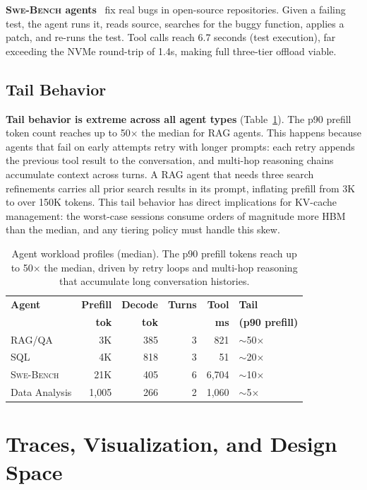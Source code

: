 \documentclass[10pt,twocolumn]{article}
\begin{document}
\textbf{\textsc{Swe-Bench} agents}~\cite{yang2024swebench} fix real bugs in open-source repositories. Given a failing test, the agent runs it, reads source, searches for the buggy function, applies a patch, and re-runs the test. Tool calls reach 6.7 seconds (test execution), far exceeding the NVMe round-trip of 1.4s, making full three-tier offload viable.

\subsection{Tail Behavior}

\textbf{Tail behavior is extreme across all agent types} (Table~\ref{tab:agents}). The p90 prefill token count reaches up to 50$\times$ the median for RAG agents. This happens because agents that fail on early attempts retry with longer prompts: each retry appends the previous tool result to the conversation, and multi-hop reasoning chains accumulate context across turns. A RAG agent that needs three search refinements carries all prior search results in its prompt, inflating prefill from 3K to over 150K tokens. This tail behavior has direct implications for KV-cache management: the worst-case sessions consume orders of magnitude more HBM than the median, and any tiering policy must handle this skew.

\begin{table}[t]
\caption{Agent workload profiles (median). The p90 prefill tokens reach up to 50$\times$ the median, driven by retry loops and multi-hop reasoning that accumulate long conversation histories.}
\label{tab:agents}
\centering
\footnotesize
\begin{tabular}{lrrrrl}
\toprule
\textbf{Agent} & \textbf{Prefill} & \textbf{Decode} & \textbf{Turns} & \textbf{Tool} & \textbf{Tail} \\
 & \textbf{tok} & \textbf{tok} & & \textbf{ms} & \textbf{(p90 prefill)} \\
\midrule
RAG/QA         & 3K     & 385 & 3 & 821   & $\sim$50$\times$ \\
SQL            & 4K     & 818 & 3 & 51    & $\sim$20$\times$ \\
\textsc{Swe-Bench}  & 21K    & 405 & 6 & 6,704 & $\sim$10$\times$ \\
Data Analysis  & 1,005  & 266 & 2 & 1,060 & $\sim$5$\times$ \\
\bottomrule
\end{tabular}
\end{table}

\section{Traces, Visualization, and Design Space}
\end{document}
